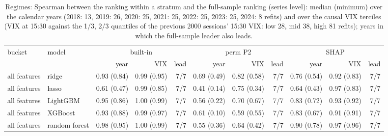 \documentclass[10pt]{article}
\begin{document}
\begin{table}[H]\centering\scriptsize
\caption{Regimes: Spearman between the ranking within a stratum and the full-sample ranking (series level): median (minimum) over the calendar years (2018: 13, 2019: 26, 2020: 25, 2021: 25, 2022: 25, 2023: 25, 2024: 8 refits) and over the causal VIX terciles (VIX at 15:30 against the 1/3, 2/3 quantiles of the previous 2000 sessions' 15:30 VIX: low 28, mid 38, high 81 refits); years in which the full-sample leader also leads.}
\begin{tabular}{llrrrrrrrrr}\toprule
bucket & model & \multicolumn{3}{c}{built-in} & \multicolumn{3}{c}{perm P2} & \multicolumn{3}{c}{SHAP}\\ & & year & VIX & lead & year & VIX & lead & year & VIX & lead\\\midrule
all features & ridge & 0.93 (0.84) & 0.99 (0.95) & 7/7 & 0.69 (0.49) & 0.82 (0.58) & 7/7 & 0.76 (0.54) & 0.92 (0.83) & 7/7 \\
all features & lasso & 0.61 (0.47) & 0.99 (0.85) & 7/7 & 0.41 (0.14) & 0.75 (0.34) & 7/7 & 0.64 (0.43) & 0.97 (0.83) & 7/7 \\
all features & LightGBM & 0.95 (0.86) & 1.00 (0.99) & 7/7 & 0.56 (0.22) & 0.70 (0.67) & 7/7 & 0.83 (0.72) & 0.93 (0.92) & 7/7 \\
all features & XGBoost & 0.93 (0.88) & 0.99 (0.97) & 7/7 & 0.61 (0.10) & 0.59 (0.55) & 7/7 & 0.83 (0.67) & 0.91 (0.91) & 7/7 \\
all features & random forest & 0.98 (0.95) & 1.00 (0.99) & 7/7 & 0.55 (0.36) & 0.64 (0.42) & 7/7 & 0.90 (0.78) & 0.97 (0.96) & 7/7 \\
\bottomrule\end{tabular}\end{table}
\end{document}
